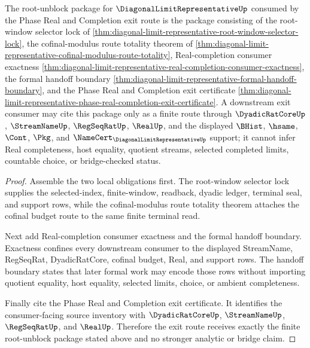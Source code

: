 \begin{theorem}
\label{thm:diagonal-limit-representative-phase-exit-unblock-package}
The root-unblock package for $\DiagonalLimitRepresentativeUp$ consumed by the Phase Real and Completion exit route is the package consisting of the root-window selector lock of \autoref{thm:diagonal-limit-representative-root-window-selector-lock}, the cofinal-modulus route totality theorem of \autoref{thm:diagonal-limit-representative-cofinal-modulus-route-totality}, Real-completion consumer exactness \autoref{thm:diagonal-limit-representative-real-completion-consumer-exactness}, the formal handoff boundary \autoref{thm:diagonal-limit-representative-formal-handoff-boundary}, and the Phase Real and Completion exit certificate \autoref{thm:diagonal-limit-representative-phase-real-completion-exit-certificate}. A downstream exit consumer may cite this package only as a finite route through $\DyadicRatCoreUp$, $\StreamNameUp$, $\RegSeqRatUp$, $\RealUp$, and the displayed $\BHist$, $\hsame$, $\Cont$, $\Pkg$, and $\NameCert_{\DiagonalLimitRepresentativeUp}$ support; it cannot infer Real completeness, host equality, quotient streams, selected completed limits, countable choice, or bridge-checked status.
\end{theorem}
\begin{proof}
Assemble the two local obligations first. The root-window selector lock supplies the selected-index, finite-window, readback, dyadic ledger, terminal seal, and support rows, while the cofinal-modulus route totality theorem attaches the cofinal budget route to the same finite terminal read.

Next add Real-completion consumer exactness and the formal handoff boundary. Exactness confines every downstream consumer to the displayed StreamName, RegSeqRat, DyadicRatCore, cofinal budget, Real, and support rows. The handoff boundary states that later formal work may encode those rows without importing quotient equality, host equality, selected limits, choice, or ambient completeness.

Finally cite the Phase Real and Completion exit certificate. It identifies the consumer-facing source inventory with $\DyadicRatCoreUp$, $\StreamNameUp$, $\RegSeqRatUp$, and $\RealUp$. Therefore the exit route receives exactly the finite root-unblock package stated above and no stronger analytic or bridge claim.
\end{proof}
